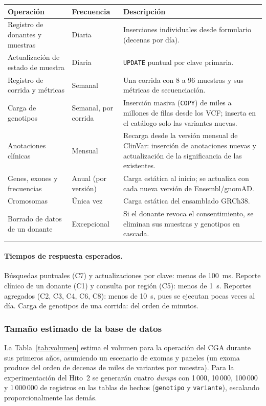 \documentclass[11pt,a4paper]{article}
\newcommand{\tb}[1]{\texttt{#1}}
\begin{document}
\begin{longtable}{>{\raggedright\arraybackslash}p{4.3cm} >{\raggedright\arraybackslash}p{3cm} >{\raggedright\arraybackslash}p{7.4cm}}
\toprule
\textbf{Operación} & \textbf{Frecuencia} & \textbf{Descripción} \\
\midrule
\endhead
Registro de donantes y muestras & Diaria & Inserciones individuales desde formulario (decenas por día). \\
Actualización de estado de muestra & Diaria & \tb{UPDATE} puntual por clave primaria. \\
Registro de corrida y métricas & Semanal & Una corrida con 8 a 96 muestras y sus métricas de secuenciación. \\
Carga de genotipos & Semanal, por corrida & Inserción masiva (\tb{COPY}) de miles a millones de filas desde los VCF; inserta en el catálogo solo las variantes nuevas. \\
Anotaciones clínicas & Mensual & Recarga desde la versión mensual de ClinVar: inserción de anotaciones nuevas y actualización de la significancia de las existentes. \\
Genes, exones y frecuencias & Anual (por versión) & Carga estática al inicio; se actualiza con cada nueva versión de Ensembl/gnomAD. \\
Cromosomas & Única vez & Carga estática del ensamblado GRCh38. \\
Borrado de datos de un donante & Excepcional & Si el donante revoca el consentimiento, se eliminan sus muestras y genotipos en cascada. \\
\bottomrule
\end{longtable}

\paragraph{Tiempos de respuesta esperados.} Búsquedas puntuales (C7) y actualizaciones por clave: menos de 100~ms. Reporte clínico de un donante (C1) y consulta por región (C5): menos de 1~s. Reportes agregados (C2, C3, C4, C6, C8): menos de 10~s, pues se ejecutan pocas veces al día. Carga de genotipos de una corrida: del orden de minutos.

\subsubsection{Tamaño estimado de la base de datos}

La Tabla~\ref{tab:volumen} estima el volumen para la operación del CGA durante sus primeros años, asumiendo un escenario de exomas y paneles (un exoma produce del orden de decenas de miles de variantes por muestra). Para la experimentación del Hito~2 se generarán cuatro \emph{dumps} con 1\,000, 10\,000, 100\,000 y 1\,000\,000 de registros en las tablas de hechos (\tb{genotipo} y \tb{variante}), escalando proporcionalmente las demás.
\end{document}
